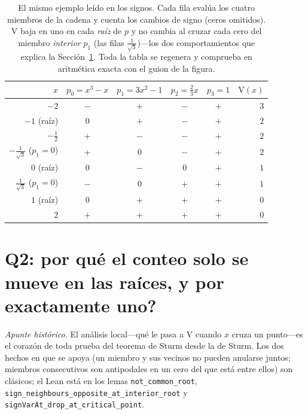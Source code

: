 \documentclass[11pt]{article}
\newcommand{\lean}[1]{\texttt{#1}}
\newcommand{\V}{\mathrm{V}}
\begin{document}
\begin{table}[t]
\centering\small
{}
\begin{tabular}{@{}rccccr@{}}
\toprule
\rowcolor{ggteal!18} $x$ & $p_0=x^3{-}x$ & $p_1=3x^2{-}1$ & $p_2=\tfrac23 x$ & $p_3=1$ & $\V(x)$ \\
\midrule
$-2$            & $-$ & $+$ & $-$ & $+$ & $3$ \\
$-1$ {\scriptsize(ra\'iz)} & $0$ & $+$ & $-$ & $+$ & $2$ \\
$-\tfrac12$     & $+$ & $-$ & $-$ & $+$ & $2$ \\
$-\tfrac{1}{\sqrt3}$ {\scriptsize($p_1{=}0$)} & $+$ & $0$ & $-$ & $+$ & $2$ \\
$0$ {\scriptsize(ra\'iz)}  & $0$ & $-$ & $0$ & $+$ & $1$ \\
$\tfrac{1}{\sqrt3}$ {\scriptsize($p_1{=}0$)}  & $-$ & $0$ & $+$ & $+$ & $1$ \\
$1$ {\scriptsize(ra\'iz)}  & $0$ & $+$ & $+$ & $+$ & $0$ \\
$2$             & $+$ & $+$ & $+$ & $+$ & $0$ \\
\bottomrule
\end{tabular}
\caption{El mismo ejemplo le\'ido en los signos. Cada fila eval\'ua los cuatro miembros de la cadena
y cuenta los cambios de signo (ceros omitidos). $\V$ baja en uno en cada \emph{ra\'iz} de $p$ y no
cambia al cruzar cada cero del miembro \emph{interior} $p_1$ (las filas $\tfrac{1}{\sqrt3}$)---los
dos comportamientos que explica la Secci\'on~\ref{sec:q2}. Toda la tabla se regenera y comprueba en
aritm\'etica exacta con el guion de la figura.}
\label{tab:signs}
\end{table}

\section{Q2: \textquestiondown por qu\'e el conteo solo se mueve en las ra\'ices, y por exactamente
uno?}\label{sec:q2}

\emph{Apunte hist\'orico.} El an\'alisis local---qu\'e le pasa a $\V$ cuando $x$ cruza un punto---es
el coraz\'on de toda prueba del teorema de Sturm desde la de Sturm. Los dos hechos en que se apoya (un
miembro y sus vecinos no pueden anularse juntos; miembros consecutivos son antipodales en un cero del
que est\'a entre ellos) son cl\'asicos; el Lean est\'a en los lemas \lean{not\_common\_root},
\lean{sign\_neighbours\_opposite\_at\_interior\_root} y \lean{signVarAt\_drop\_at\_critical\_point}.
\end{document}
